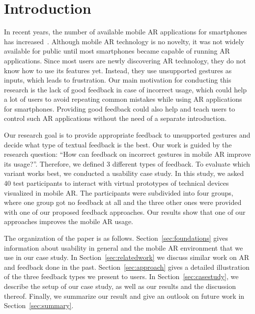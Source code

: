 \documentclass[manuscript]{acmart}
\begin{document}
	\maketitle
	\pagebreak
	\section{Introduction}\label{sec:introduction}
		In recent years, the number of available mobile \ac{AR} applications for smartphones has increased~\citep{Tractica2017}. Although mobile \ac{AR} technology is no novelty, it was not widely available for public until most smartphones became capable of running \ac{AR} applications. Since most users are newly discovering \ac{AR} technology, they do not know how to use its features yet. Instead, they use unsupported gestures as inputs, which leads to frustration. Our main motivation for conducting this research is the lack of good feedback in case of incorrect usage, which could help a lot of users to avoid repeating common mistakes while using \ac{AR} applications for smartphones. Providing good feedback could also help and teach users to control such \ac{AR} applications without the need of a separate introduction.

		Our research goal is to provide appropriate feedback to unsupported gestures and decide what type of textual feedback is the best. Our work is guided by the research question: ``How can feedback on incorrect gestures in mobile AR improve its usage?''. Therefore, we defined 3 different types of feedback. To evaluate which variant works best, we conducted a usability case study. In this study, we asked 40 test participants to interact with virtual prototypes of technical devices visualized in mobile \ac{AR}. The participants were subdivided into four groups, where one group got no feedback at all and the three other ones were provided with one of our proposed feedback approaches. Our results show that one of our approaches improves the mobile \ac{AR} usage.

		The organization of the paper is as follows. Section~\ref{sec:foundations} gives information about usability in general and the mobile \ac{AR} environment that we use in our case study. In Section~\ref{sec:relatedwork} we discuss similar work on \ac{AR} and feedback done in the past. Section~\ref{sec:approach} gives a detailed illustration of the three feedback types we present to users. In Section~\ref{sec:casestudy}, we describe the setup of our case study, as well as our results and the discussion thereof. Finally, we summarize our result and give an outlook on future work in Section~\ref{sec:summary}.
\end{document}
